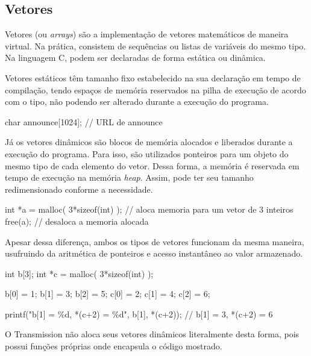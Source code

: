 
\subsection*{Vetores}

Vetores (ou \emph{arrays}) são a implementação de vetores matemáticos de maneira
virtual. Na prática, consistem de sequências ou listas de variáveis do mesmo tipo. Na
linguagem C, podem ser declaradas de forma estática ou dinâmica.

Vetores estáticos têm tamanho fixo estabelecido na sua declaração em tempo de
compilação, tendo espaços de memória reservados na pilha de execução de acordo com o
tipo, não podendo ser alterado durante a execução do programa.

\begin{ccode}
    char announce[1024]; // URL de announce
\end{ccode}

Já os vetores dinâmicos são blocos de memória alocados e liberados durante a execução do
programa. Para isso, são utilizados ponteiros para um objeto do mesmo tipo de cada
elemento do vetor. Dessa forma, a memória é reservada em tempo de execução na memória
\emph{heap}. Assim, pode ter seu tamanho redimensionado conforme a necessidade.

\begin{ccode}
    int *a = malloc( 3*sizeof(int) ); // aloca memoria para um vetor de 3 inteiros
    free(a);                          // desaloca a memoria alocada
\end{ccode}

Apesar dessa diferença, ambos os tipos de vetores funcionam da mesma maneira, usufruindo
da aritmética de ponteiros e acesso instantâneo ao valor armazenado.

\begin{ccode}
    int b[3];
    int *c = malloc( 3*sizeof(int) );

    b[0] = 1; b[1] = 3; b[2] = 5;
    c[0] = 2; c[1] = 4; c[2] = 6;

    printf("b[1] = \%d, *(c+2) = \%d\n", b[1], *(c+2)); // b[1] = 3, *(c+2) = 6
\end{ccode}

O Transmission não aloca seus vetores dinâmicos literalmente desta forma, pois possui
funções próprias onde encapsula o código mostrado.
